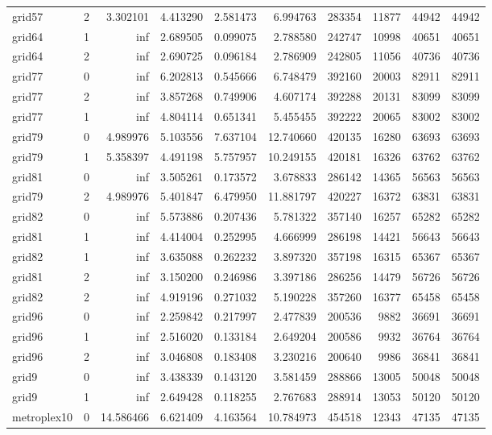 \begin{longtable}{|l|r|r|r|r|r|r|r|r|r|}
grid57 & 2 & 3.302101 & 4.413290 & 2.581473 & 6.994763 & 283354 & 11877 & 44942 & 44942 \\
grid64 & 1 & inf & 2.689505 & 0.099075 & 2.788580 & 242747 & 10998 & 40651 & 40651 \\
grid64 & 2 & inf & 2.690725 & 0.096184 & 2.786909 & 242805 & 11056 & 40736 & 40736 \\
grid77 & 0 & inf & 6.202813 & 0.545666 & 6.748479 & 392160 & 20003 & 82911 & 82911 \\
grid77 & 2 & inf & 3.857268 & 0.749906 & 4.607174 & 392288 & 20131 & 83099 & 83099 \\
grid77 & 1 & inf & 4.804114 & 0.651341 & 5.455455 & 392222 & 20065 & 83002 & 83002 \\
grid79 & 0 & 4.989976 & 5.103556 & 7.637104 & 12.740660 & 420135 & 16280 & 63693 & 63693 \\
grid79 & 1 & 5.358397 & 4.491198 & 5.757957 & 10.249155 & 420181 & 16326 & 63762 & 63762 \\
grid81 & 0 & inf & 3.505261 & 0.173572 & 3.678833 & 286142 & 14365 & 56563 & 56563 \\
grid79 & 2 & 4.989976 & 5.401847 & 6.479950 & 11.881797 & 420227 & 16372 & 63831 & 63831 \\
grid82 & 0 & inf & 5.573886 & 0.207436 & 5.781322 & 357140 & 16257 & 65282 & 65282 \\
grid81 & 1 & inf & 4.414004 & 0.252995 & 4.666999 & 286198 & 14421 & 56643 & 56643 \\
grid82 & 1 & inf & 3.635088 & 0.262232 & 3.897320 & 357198 & 16315 & 65367 & 65367 \\
grid81 & 2 & inf & 3.150200 & 0.246986 & 3.397186 & 286256 & 14479 & 56726 & 56726 \\
grid82 & 2 & inf & 4.919196 & 0.271032 & 5.190228 & 357260 & 16377 & 65458 & 65458 \\
grid96 & 0 & inf & 2.259842 & 0.217997 & 2.477839 & 200536 & 9882 & 36691 & 36691 \\
grid96 & 1 & inf & 2.516020 & 0.133184 & 2.649204 & 200586 & 9932 & 36764 & 36764 \\
grid96 & 2 & inf & 3.046808 & 0.183408 & 3.230216 & 200640 & 9986 & 36841 & 36841 \\
grid9 & 0 & inf & 3.438339 & 0.143120 & 3.581459 & 288866 & 13005 & 50048 & 50048 \\
grid9 & 1 & inf & 2.649428 & 0.118255 & 2.767683 & 288914 & 13053 & 50120 & 50120 \\
metroplex10 & 0 & 14.586466 & 6.621409 & 4.163564 & 10.784973 & 454518 & 12343 & 47135 & 47135 \\

\end{longtable}
